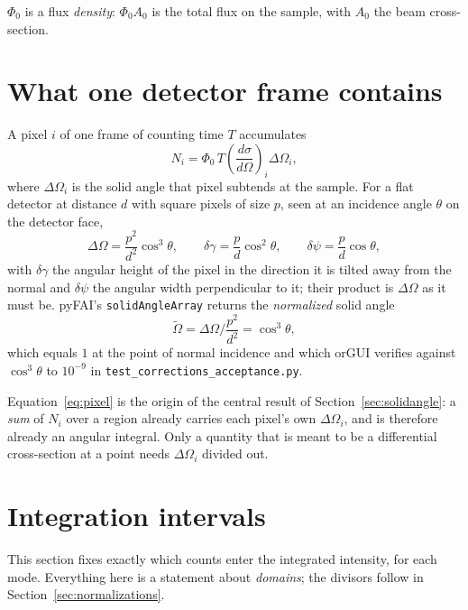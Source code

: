 \documentclass[11pt,a4paper]{article}
\newcommand{\dOm}{\Delta\Omega}
\newcommand{\Ored}{\widetilde{\Omega}}
\newcommand{\code}[1]{\texttt{\small #1}}
\begin{document}
\noindent
$\Phi_0$ is a flux \emph{density}: $\Phi_0 A_0$ is the total flux on the
sample, with $A_0$ the beam cross-section.

\section{What one detector frame contains}
\label{sec:frame}

A pixel $i$ of one frame of counting time $T$ accumulates
\begin{equation}
  N_i = \Phi_0\, T \left(\frac{d\sigma}{d\Omega}\right)_{\!i} \dOm_i ,
  \label{eq:pixel}
\end{equation}
where $\dOm_i$ is the solid angle that pixel subtends at the sample. For a
flat detector at distance $d$ with square pixels of size $p$, seen at an
incidence angle $\theta$ on the detector face,
\begin{equation}
  \dOm = \frac{p^{2}}{d^{2}}\cos^{3}\theta ,
  \qquad
  \delta\gamma = \frac{p}{d}\cos^{2}\theta ,
  \qquad
  \delta\psi = \frac{p}{d}\cos\theta ,
  \label{eq:pixelgeom}
\end{equation}
with $\delta\gamma$ the angular height of the pixel in the direction it is
tilted away from the normal and $\delta\psi$ the angular width perpendicular
to it; their product is $\dOm$ as it must be. pyFAI's
\code{solidAngleArray} returns the \emph{normalized} solid angle
\begin{equation}
  \Ored = \dOm \Big/ \frac{p^{2}}{d^{2}} = \cos^{3}\theta ,
\end{equation}
which equals $1$ at the point of normal incidence and which orGUI verifies
against $\cos^{3}\theta$ to $10^{-9}$ in
\code{test\_corrections\_acceptance.py}.

Equation~\eqref{eq:pixel} is the origin of the central result of
Section~\ref{sec:solidangle}: a \emph{sum} of $N_i$ over a region already
carries each pixel's own $\dOm_i$, and is therefore already an angular
integral. Only a quantity that is meant to be a differential cross-section at
a point needs $\dOm_i$ divided out.

\section{Integration intervals}
\label{sec:intervals}

This section fixes exactly which counts enter the integrated intensity, for
each mode. Everything here is a statement about \emph{domains}; the divisors
follow in Section~\ref{sec:normalizations}.
\end{document}
